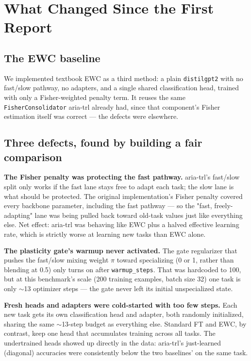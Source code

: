 \documentclass[10pt,twocolumn]{article}
\begin{document}
\section{What Changed Since the First Report}
\label{sec:changes}

\subsection{The EWC baseline}

We implemented textbook EWC as a third method: a plain \texttt{distilgpt2}
with no fast/slow pathway, no adapters, and a single shared classification
head, trained with only a Fisher-weighted penalty term. It reuses the same
\texttt{FisherConsolidator} aria-trl already had, since that component's
Fisher estimation itself was correct — the defects were elsewhere.

\subsection{Three defects, found by building a fair comparison}

\textbf{The Fisher penalty was protecting the fast pathway.} aria-trl's
fast/slow split only works if the fast lane stays free to adapt each task;
the slow lane is what should be protected. The original implementation's
Fisher penalty covered every backbone parameter, including the fast pathway
— so the "fast, freely-adapting" lane was being pulled back toward old-task
values just like everything else. Net effect: aria-trl was behaving like
EWC plus a halved effective learning rate, which is strictly worse at
learning new tasks than EWC alone.

\textbf{The plasticity gate's warmup never activated.} The gate
regularizer that pushes the fast/slow mixing weight $\pi$ toward
specializing (0 or 1, rather than blending at 0.5) only turns on after
\texttt{warmup\_steps}. That was hardcoded to 100, but at this benchmark's
scale (200 training examples, batch size 32) one task is only $\sim$13
optimizer steps — the gate never left its initial unspecialized state.

\textbf{Fresh heads and adapters were cold-started with too few steps.}
Each new task gets its own classification head and adapter, both
randomly initialized, sharing the same $\sim$13-step budget as everything
else. Standard FT and EWC, by contrast, keep one head that accumulates
training across all tasks. The undertrained heads showed up directly in the
data: aria-trl's just-learned (diagonal) accuracies were consistently below
the two baselines' on the same task.
\end{document}
